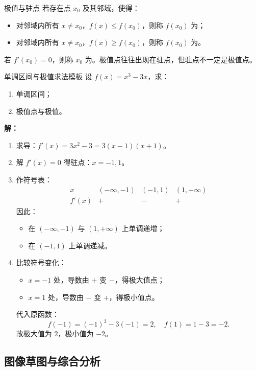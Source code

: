 \documentclass[a4paper,11pt]{ctexart}
\begin{document}
\begin{definitionbox}{极值与驻点}
若存在点 $x_0$ 及其邻域，使得：
\begin{itemize}
  \item 对邻域内所有 $x\ne x_0$，$f(x)\le f(x_0)$，则称 $f(x_0)$ 为；
  \item 对邻域内所有 $x\ne x_0$，$f(x)\ge f(x_0)$，则称 $f(x_0)$ 为。
\end{itemize}
若 $f'(x_0)=0$，则称 $x_0$ 为。极值点往往出现在驻点，但驻点不一定是极值点。
\end{definitionbox}

\begin{examplebox}{单调区间与极值求法模板}
设 $f(x)=x^3-3x$，求：
\begin{enumerate}
  \item 单调区间；
  \item 极值点与极值。
\end{enumerate}
\textbf{解：}
\begin{enumerate}
  \item 求导：$f'(x)=3x^2-3=3(x-1)(x+1)$。
  \item 解 $f'(x)=0$ 得驻点：$x=-1,1$。
  \item 作符号表：
  \[
    \begin{array}{c|ccc}
      x & (-\infty,-1) & (-1,1) & (1,+\infty)\\\hline
      f'(x) & + & - & +
    \end{array}
  \]
  因此：
  \begin{itemize}
    \item 在 $(-\infty,-1)$ 与 $(1,+\infty)$ 上单调递增；
    \item 在 $(-1,1)$ 上单调递减。
  \end{itemize}
  \item 比较符号变化：
  \begin{itemize}
    \item $x=-1$ 处，导数由 $+$ 变 $-$，得极大值点；
    \item $x=1$ 处，导数由 $-$ 变 $+$，得极小值点。
  \end{itemize}
  代入原函数：
  \[
    f(-1)=(-1)^3-3(-1)=2,\quad f(1)=1-3=-2.
  \]
  故极大值为 $2$，极小值为 $-2$。
\end{enumerate}
\end{examplebox}

\subsection{图像草图与综合分析}
\end{document}
